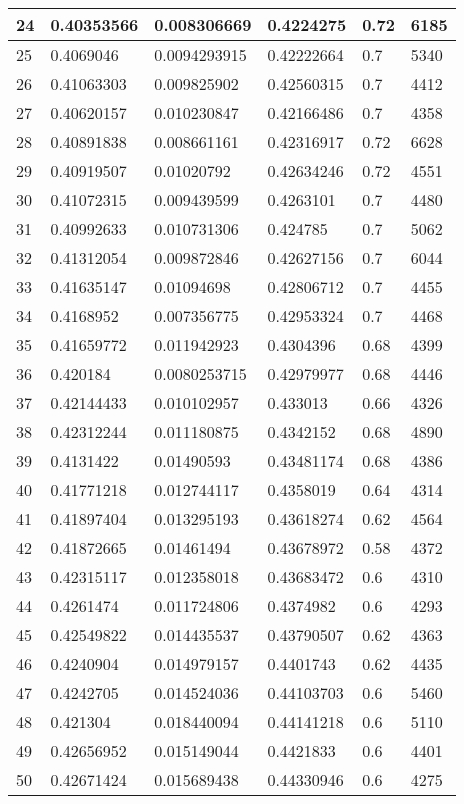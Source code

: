 \begin{longtable}{|l|l|l|l|l|l|}
24 & 0.40353566 & 0.008306669 & 0.4224275 & 0.72 & 6185 \\ \hline 
25 & 0.4069046 & 0.0094293915 & 0.42222664 & 0.7 & 5340 \\ \hline 
26 & 0.41063303 & 0.009825902 & 0.42560315 & 0.7 & 4412 \\ \hline 
27 & 0.40620157 & 0.010230847 & 0.42166486 & 0.7 & 4358 \\ \hline 
28 & 0.40891838 & 0.008661161 & 0.42316917 & 0.72 & 6628 \\ \hline 
29 & 0.40919507 & 0.01020792 & 0.42634246 & 0.72 & 4551 \\ \hline 
30 & 0.41072315 & 0.009439599 & 0.4263101 & 0.7 & 4480 \\ \hline 
31 & 0.40992633 & 0.010731306 & 0.424785 & 0.7 & 5062 \\ \hline 
32 & 0.41312054 & 0.009872846 & 0.42627156 & 0.7 & 6044 \\ \hline 
33 & 0.41635147 & 0.01094698 & 0.42806712 & 0.7 & 4455 \\ \hline 
34 & 0.4168952 & 0.007356775 & 0.42953324 & 0.7 & 4468 \\ \hline 
35 & 0.41659772 & 0.011942923 & 0.4304396 & 0.68 & 4399 \\ \hline 
36 & 0.420184 & 0.0080253715 & 0.42979977 & 0.68 & 4446 \\ \hline 
37 & 0.42144433 & 0.010102957 & 0.433013 & 0.66 & 4326 \\ \hline 
38 & 0.42312244 & 0.011180875 & 0.4342152 & 0.68 & 4890 \\ \hline 
39 & 0.4131422 & 0.01490593 & 0.43481174 & 0.68 & 4386 \\ \hline 
40 & 0.41771218 & 0.012744117 & 0.4358019 & 0.64 & 4314 \\ \hline 
41 & 0.41897404 & 0.013295193 & 0.43618274 & 0.62 & 4564 \\ \hline 
42 & 0.41872665 & 0.01461494 & 0.43678972 & 0.58 & 4372 \\ \hline 
43 & 0.42315117 & 0.012358018 & 0.43683472 & 0.6 & 4310 \\ \hline 
44 & 0.4261474 & 0.011724806 & 0.4374982 & 0.6 & 4293 \\ \hline 
45 & 0.42549822 & 0.014435537 & 0.43790507 & 0.62 & 4363 \\ \hline 
46 & 0.4240904 & 0.014979157 & 0.4401743 & 0.62 & 4435 \\ \hline 
47 & 0.4242705 & 0.014524036 & 0.44103703 & 0.6 & 5460 \\ \hline 
48 & 0.421304 & 0.018440094 & 0.44141218 & 0.6 & 5110 \\ \hline 
49 & 0.42656952 & 0.015149044 & 0.4421833 & 0.6 & 4401 \\ \hline 
50 & 0.42671424 & 0.015689438 & 0.44330946 & 0.6 & 4275 \\ \hline 
\end{longtable}
